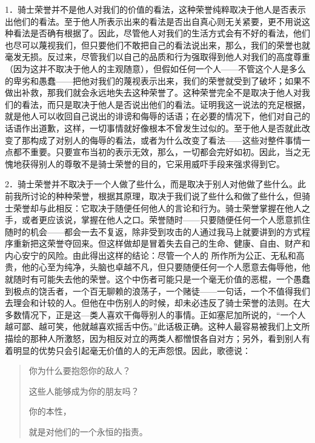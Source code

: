 \documentclass[12pt,oneside]{book}
\begin{document}
1．骑士荣誉并不是他人对我们的价值的看法，这种荣誉纯粹取决于他人是否表示出他们的看法。至于他人所表示出来的看法是否出自真心则无关紧要，更不用说这种看法是否确有根据了。因此，尽管他人对我们的生活方式会有不好的看法，他们也尽可以蔑视我们，但只要他们不敢把自己的看法说出来，那么，我们的荣誉也就毫发无损。反过来，尽管我们以自己的品质和行为强取得到他人对我们的高度尊重（因为这并不取决于他人的主观随意），但假如任何一个人——不管这个人是多么的卑劣和愚蠢——把他对我们的蔑视表示出来，我们的荣誉就受到了破坏；如果不做出补救，那我们就会永远地失去这种荣誉了。这种荣誉完全不是取决于他人对我们的看法，而只是取决于他人是否说出他们的看法。证明我这一说法的充足根据，就是他人可以收回自己说出的诽谤和侮辱的话语；在必要的情况下，他们对自己的话语作出道歉，这样，一切事情就好像根本不曾发生过似的。至于他人是否就此改变了那构成了对别人的侮辱的看法，或者为什么改变了看法——这些对整件事情一点都不重要。只要宣布当初的表示无效，那么，一切都会完好如初。因此，当之无愧地获得别人的尊敬不是骑士荣誉的目的，它采用威吓手段来强求得到它。 

2．骑士荣誉并不取决于一个人做了些什么，而是取决于别人对他做了些什么。此前我所讨论的种种荣誉，根据其原理，取决于我们说了些什么和做了些什么，但骑士荣誉却与此相反：它取决于随便任何他人的言论和行为。骑士荣誉掌握在他人之手，或者更应该说，掌握在他人之口。荣誉随时——只要随便任何一个人愿意抓住随时的机会——都会一去不复返，除非受到攻击的人通过我马上就要讲到的方式程序重新把这荣誉夺回来。但这样做却是冒着失去自己的生命、健康、自由、财产和内心安宁的风险。由此得出这样的结论：尽管一个人的
所作所为公正、无私和高贵，他的心至为纯净，头脑也卓越不凡，但只要随便任何一个人愿意去侮辱他，他就随时有可能失去他的荣誉。这个中伤者可能只是一个毫无价值的恶棍，一个愚蠢到极点的饶舌者，一个百无聊赖的浪荡子，一个赌徒——一句话，一个不值得我们去理会和计较的人。但他在中伤别人的时候，却未必违反了骑士荣誉的法则。在大多数情况下，正是这—类人喜欢干侮辱别人的事情。正如塞尼加所说的，“一个人越可鄙、越可笑，他就越喜欢摇舌中伤。”此话极正确。这种人最容易被我们上文所描绘的那种人所激怒，因为相反对立的两类人都憎恨各自对方；另外，看到别人有着明显的优势只会引起毫无价值的人的无声怨恨。因此，歌德说： 

 
\begin{quotation}
你为什么要抱怨你的敌人？ 

这些人能够成为你的朋友吗？ 

你的本性， 

就是对他们的一个永恒的指责。 
\end{quotation}
\end{document}
